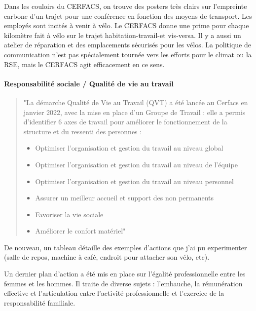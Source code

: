     Dans les couloirs du CERFACS, on trouve des posters très clairs sur l'empreinte carbone d'un trajet pour une conférence en fonction des moyens de transport.
    Les employés sont incités à venir à vélo. Le CERFACS donne une prime pour chaque kilomètre fait à vélo sur le trajet habitation-travail-et vis-versa. Il y a aussi un atelier de réparation et des emplacements sécurisés pour les vélos.
    La politique de communication n'est pas spécialement tournée vers les efforts pour le climat ou la RSE, mais le CERFACS agit efficacement en ce sens.

\paragraph{Responsabilité sociale / Qualité de vie au travail}
    \begin{quote}
        \setlength{\leftmargin}{0.5cm} %
        \setlength{\rightmargin}{0.5cm} %
        "La démarche Qualité de Vie au Travail (QVT) a été lancée au Cerfacs en janvier 2022, avec la mise en
        place d’un Groupe de Travail : elle a permis d’identifier 6 axes de travail pour améliorer le
        fonctionnement de la structure et du ressenti des personnes :
        \begin{itemize}
            \item Optimiser l’organisation et gestion du travail au niveau global
            \item Optimiser l’organisation et gestion du travail au niveau de l’équipe
            \item Optimiser l’organisation et gestion du travail au niveau personnel
            \item Assurer un meilleur accueil et support des non permanents
            \item Favoriser la vie sociale
            \item Améliorer le confort matériel"
        \end{itemize}
    \end{quote}

    De nouveau, un tableau  détaille des exemples d'actions que j'ai pu experimenter (salle de repos, machine à café, endroit pour attacher son vélo, etc).

    Un dernier plan d'action a été mis en place sur l'égalité professionnelle entre les femmes et les hommes. Il traite de diverse sujets : l’embauche, la rémunération effective et l’articulation entre l’activité professionnelle et l’exercice de la responsabilité familiale.

